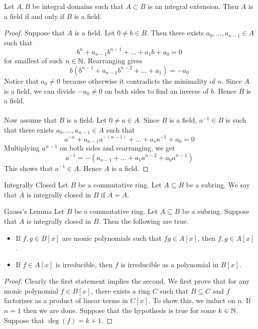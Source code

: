 \documentclass[a4paper]{article}
\begin{document}
\begin{lmm}{}{} Let $A,B$ be integral domains such that $A\subset B$ is an integral extension. Then $A$ is a field if and only if $B$ is a field. 
\begin{proof}
Suppose that $A$ is a field. Let $0\neq b\in B$. Then there exists $a_0,\dots,a_{n-1}\in A$ such that $$b^n+a_{n-1}b^{n-1}+\dots+a_1b+a_0=0$$ for smallest of such $n\in\mathbb{N}$. Rearranging gives $$b(b^{n-1}+a_{n-1}b^{n-2}+\dots+a_1)=-a_0$$ Notice that $a_0\neq 0$ because otherwise it contradicts the minimality of $n$. Since $A$ is a field, we can divide $-a_0\neq 0$ on both sides to find an inverse of $b$. Hence $B$ is a field. \\~\\

Now assume that $B$ is a field. Let $0\neq a\in A$. Since $B$ is a field, $a^{-1}\in B$ is such that there exists $a_0,\dots,a_{n-1}\in A$ such that $$a^{-n}+a_{n-1}a^{-(n-1)}+\dots+a_1a^{-1}+a_0=0$$ Multiplying $a^{n-1}$ on both sides and rearranging, we get $$a^{-1}=-\left(a_{n-1}+\dots+a_1a^{n-2}+a_0a^{n-1}\right)$$ This shows that $a^{-1}\in A$. Hence $A$ is a field. 
\end{proof}
\end{lmm}

\begin{defn}{Integrally Closed}{} Let $B$ be a commutative ring. Let $A\subseteq B$ be a subring. We say that $A$ is integrally closed in $B$ if $\overline{A}=A$. 
\end{defn}

\begin{thm}{Gauss's Lemma}{} Let $B$ be a commutative ring. Let $A\subseteq B$ be a subring. Suppose that $A$ is integrally closed in $B$. Then the following are true. 
\begin{itemize}
\item If $f,g\in B[x]$ are monic polynomials such that $fg\in A[x]$, then $f,g\in A[x]$. 
\item If $f\in A[x]$ is irreducible, then $f$ is irreducible as a polynomial in $B[x]$. 
\end{itemize} 
\begin{proof}
Clearly the first statement implies the second. We first prove that for any monic polynomial $f\in B[x]$, there exists a ring $C$ such that $B\subseteq C$ and $f$ factorizes as a product of linear terms in $C[x]$. To show this, we induct on $n$. If $n=1$ then we are done. Suppose that the hypothesis is true for some $k\in\mathbb{N}$. Suppose that $\deg(f)=k+1$. 
\end{proof}
\end{thm}
\end{document}
